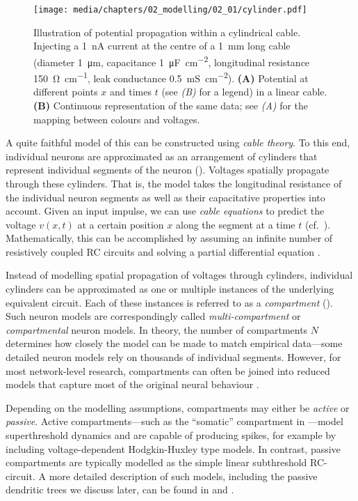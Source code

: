 \begin{figure}
	\texttt{[image: media/chapters/02\_modelling/02\_01/cylinder.pdf]}
	\caption[Illustration of potential propagation within a cylindrical cable.]{Illustration of potential propagation within a cylindrical cable. Injecting a \SI{1}{\nano\ampere} current at the centre of a \SI{1}{\milli\metre} long cable (diameter \SI{1}{\micro\metre}, capacitance \SI{1}{\micro\farad\per\square\centi\metre}, longitudinal resistance \SI{150}{\ohm\per\centi\metre}, leak conductance \SI{0.5}{\milli\siemens\per\square\centi\metre}). \textbf{(A)} Potential at different points $x$ and times $t$ (see \emph{(B)} for a legend) in a linear cable. \textbf{(B)} Continuous representation of the same data; see \emph{(A)} for the mapping between colours and voltages.}
	\label{fig:cylinder}
\end{figure}

A quite faithful model of this can be constructed using \emph{cable theory}.
To this end, individual neurons are approximated as an arrangement of cylinders that represent individual segments of the neuron ().
Voltages spatially propagate through these cylinders. That is, the model takes the longitudinal resistance of the individual neuron segments as well as their capacitative properties into account.
Given an input impulse, we can use \emph{cable equations} to predict the voltage $v(x, t)$ at a certain position $x$ along the segment at a time $t$ (cf.~).
Mathematically, this can be accomplished by assuming an infinite number of resistively coupled RC circuits and solving a partial differential equation \citep[Chapter~2]{koch1999biophysics}.


Instead of modelling spatial propagation of voltages through cylinders, individual cylinders can be approximated as one or multiple instances of the underlying equivalent circuit.
Each of these instances is referred to as a \emph{compartment} ().
Such neuron models are correspondingly called \emph{multi-compartment} or \emph{compartmental} neuron models.
In theory, the number of compartments $N$ determines how closely the model can be made to match empirical data---some detailed neuron models rely on thousands of individual segments.
However, for most network-level research, compartments can often be joined into reduced models that capture most of the original neural behaviour \citep{herz2006modeling}.

Depending on the modelling assumptions, compartments may either be \emph{active} or \emph{passive}.
Active compartments---such as the \enquote{somatic} compartment in ---model superthreshold dynamics and are capable of producing spikes, for example by including voltage-dependent Hodgkin-Huxley type models.
In contrast, passive compartments are typically modelled as the simple linear subthreshold RC-circuit.
A more detailed description of such models, including the passive dendritic trees we discuss later, can be found in \citet[Chapter~3]{koch1999biophysics} and \citet[Chapter~2]{gerstner2002spiking}.

